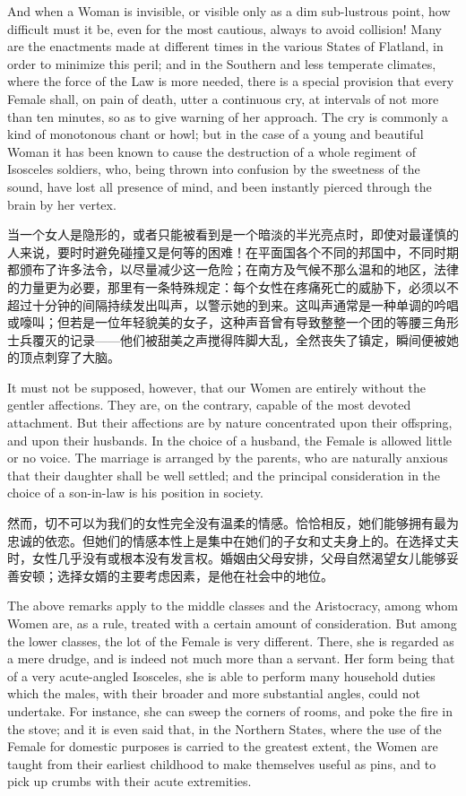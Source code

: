 \documentclass[12pt,UTF8]{ctexbook}
\begin{document}
And when a Woman is invisible, or visible only as a dim sub-lustrous point, how difficult must it be, even for the most cautious, always to avoid collision! Many are the enactments made at different times in the various States of Flatland, in order to minimize this peril; and in the Southern and less temperate climates, where the force of the Law is more needed, there is a special provision that every Female shall, on pain of death, utter a continuous cry, at intervals of not more than ten minutes, so as to give warning of her approach. The cry is commonly a kind of monotonous chant or howl; but in the case of a young and beautiful Woman it has been known to cause the destruction of a whole regiment of Isosceles soldiers, who, being thrown into confusion by the sweetness of the sound, have lost all presence of mind, and been instantly pierced through the brain by her vertex.

当一个女人是隐形的，或者只能被看到是一个暗淡的半光亮点时，即使对最谨慎的人来说，要时时避免碰撞又是何等的困难！在平面国各个不同的邦国中，不同时期都颁布了许多法令，以尽量减少这一危险；在南方及气候不那么温和的地区，法律的力量更为必要，那里有一条特殊规定：每个女性在疼痛死亡的威胁下，必须以不超过十分钟的间隔持续发出叫声，以警示她的到来。这叫声通常是一种单调的吟唱或嚎叫；但若是一位年轻貌美的女子，这种声音曾有导致整整一个团的等腰三角形士兵覆灭的记录——他们被甜美之声搅得阵脚大乱，全然丧失了镇定，瞬间便被她的顶点刺穿了大脑。

It must not be supposed, however, that our Women are entirely without the gentler affections. They are, on the contrary, capable of the most devoted attachment. But their affections are by nature concentrated upon their offspring, and upon their husbands. In the choice of a husband, the Female is allowed little or no voice. The marriage is arranged by the parents, who are naturally anxious that their daughter shall be well settled; and the principal consideration in the choice of a son-in-law is his position in society.

然而，切不可以为我们的女性完全没有温柔的情感。恰恰相反，她们能够拥有最为忠诚的依恋。但她们的情感本性上是集中在她们的子女和丈夫身上的。在选择丈夫时，女性几乎没有或根本没有发言权。婚姻由父母安排，父母自然渴望女儿能够妥善安顿；选择女婿的主要考虑因素，是他在社会中的地位。

The above remarks apply to the middle classes and the Aristocracy, among whom Women are, as a rule, treated with a certain amount of consideration. But among the lower classes, the lot of the Female is very different. There, she is regarded as a mere drudge, and is indeed not much more than a servant. Her form being that of a very acute-angled Isosceles, she is able to perform many household duties which the males, with their broader and more substantial angles, could not undertake. For instance, she can sweep the corners of rooms, and poke the fire in the stove; and it is even said that, in the Northern States, where the use of the Female for domestic purposes is carried to the greatest extent, the Women are taught from their earliest childhood to make themselves useful as pins, and to pick up crumbs with their acute extremities.
\end{document}
